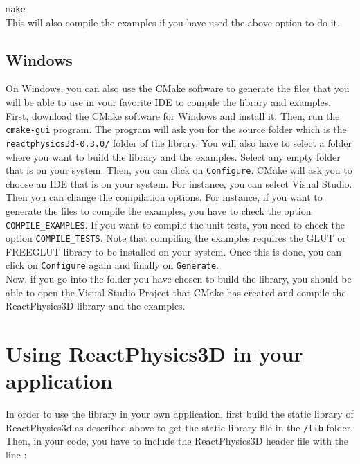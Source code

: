 \documentclass[a4paper,12pt]{article}
\begin{document}
    \texttt{make}  \\

   This will also compile the examples if you have used the above
   option to do it.

    \subsection{Windows}

     On Windows, you can also use the CMake software to generate the
     files that you will be able to use in your favorite IDE to
     compile the library and examples. \\ 

     First, download the CMake
     software for Windows and install it. Then, run the
     \texttt{cmake-gui} program. The program will ask you for the
     source folder which is the \texttt{reactphysics3d-0.3.0/} folder of
     the library. You will also have to select a folder where you want to
     build the library and the examples. Select any empty folder that
     is on your system. Then, you can click on
     \texttt{Configure}. CMake will ask you to choose an IDE that is on
     your system. For instance, you can select Visual Studio. Then you
     can change the compilation options. For instance, if you want to
     generate the files to compile the examples, you have to check the option
     \texttt{COMPILE\_EXAMPLES}. If you want to compile the unit
     tests, you need to check the option \texttt{COMPILE\_TESTS}.
     Note that compiling the examples
     requires the GLUT or FREEGLUT library to be installed on your system. Once
     this is done, you can click on \texttt{Configure} again and
     finally on \texttt{Generate}. \\ 
    
     Now, if you go into the folder you have chosen to build the
     library, you should be able to open the
     Visual Studio Project that CMake has created and compile the
     ReactPhysics3D library and the examples. 

    \section{Using ReactPhysics3D in your application}

    In order to use the library in your own application, first build
    the static library of ReactPhysics3d as described above to get the
    static library file in the \texttt{/lib} folder. Then, in your code, you have to include
    the ReactPhysics3D header file with the line : \\
\end{document}
